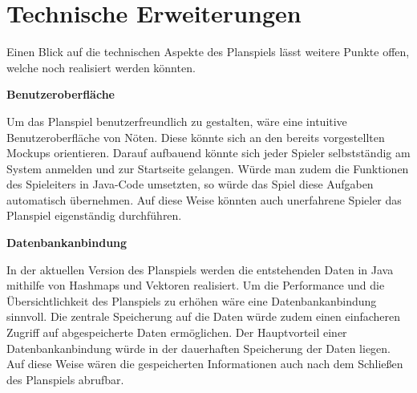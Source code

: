 \section{Technische Erweiterungen}
\label{sec:fazit-fachkonzept}

Einen Blick auf die technischen Aspekte des Planspiels lässt weitere Punkte offen, welche noch realisiert werden könnten. 

\medskip

\textbf{Benutzeroberfläche}

Um das Planspiel benutzerfreundlich zu gestalten, wäre eine intuitive Benutzeroberfläche von Nöten. Diese könnte sich an den bereits vorgestellten Mockups orientieren. Darauf aufbauend könnte sich jeder Spieler selbstständig am System anmelden und zur Startseite gelangen. Würde man zudem die Funktionen des Spieleiters in Java-Code umsetzten, so würde das Spiel diese Aufgaben automatisch übernehmen. Auf diese Weise könnten auch unerfahrene Spieler das Planspiel eigenständig durchführen. 

\medskip

\textbf{Datenbankanbindung}

In der aktuellen Version des Planspiels werden die entstehenden Daten in Java mithilfe von Hashmaps und Vektoren realisiert. Um die Performance und die Übersichtlichkeit des Planspiels zu erhöhen wäre eine Datenbankanbindung sinnvoll. Die zentrale Speicherung auf die Daten würde zudem einen einfacheren Zugriff auf abgespeicherte Daten ermöglichen. Der Hauptvorteil einer Datenbankanbindung würde in der dauerhaften Speicherung der Daten liegen. Auf diese Weise wären die gespeicherten Informationen auch nach dem Schließen des Planspiels abrufbar.